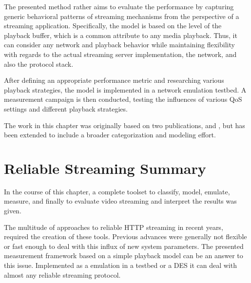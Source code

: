 The presented method rather aims to evaluate the performance by capturing generic behavioral patterns of streaming mechanisms from the perspective of a streaming application. Specifically, the model is based on the level of the playback buffer, which is a common attribute to any media playback. Thus, it can consider any network and playback behavior while maintaining flexibility with regards to the actual streaming server implementation, the network, and also the protocol stack.

After defining an appropriate performance metric and researching various playback strategies, the model is implemented in a network emulation testbed. A measurement campaign is then conducted, testing the influences of various \gls{QoS} settings and different playback strategies. 

The work in this chapter was originally based on two publications, \cite{metzger2011delivery} and \cite{6229739}, but has been extended to include a broader categorization and modeling effort.










\section{Reliable Streaming Summary}
\label{c3:sec:conclusion}

In the course of this chapter, a complete toolset to classify, model, emulate, measure, and finally to evaluate video streaming and interpret the results was given.

The multitude of approaches to reliable \gls{HTTP} streaming in recent years, required the creation of these tools. Previous advances were generally not flexible or fast enough to deal with this influx of new system parameters. The presented measurement framework based on a simple playback model can be an answer to this issue. Implemented as a emulation in a testbed or a \gls{DES} it can deal with almost any reliable streaming protocol.

